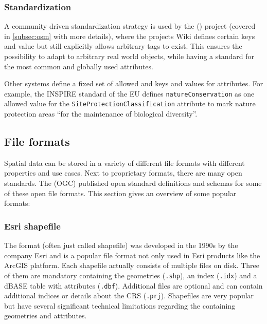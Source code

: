 		\subsubsection{Standardization}
		
			A community driven standardization strategy is used by the  () project (covered in \cref{subsec:osm} with more details), where the projects Wiki defines certain keys and value but still explicitly allows arbitrary tags to exist\cite{osm-wiki-proposal-process}.
			This ensures the possibility to adapt to arbitrary real world objects, while having a standard for the most common and globally used attributes.
			
			Other systems define a fixed set of allowed and keys and values for attributes.
			For example, the INSPIRE standard of the EU defines \texttt{natureConservation} as one allowed value for the \texttt{SiteProtectionClassification} attribute to mark nature protection areas \enquote{for the maintenance of biological diversity}\cite[31]{inspire-protected-sites}.
			
	\subsection{File formats}
	\label{subsec:file-formats}
	
		Spatial data can be stored in a variety of different file formats with different properties and use cases.
		Next to proprietary formats, there are many open standards.
		The  (OGC) published open standard definitions and schemas for some of these open file formats.		
		This section gives an overview of some popular formats:
		
		\subsubsection{Esri shapefile}
		\label{subsubsec:shapefile}
		
			The  format (often just called shapefile) was developed in the 1990s by the company Esri and is a popular file format not only used in Esri products like the ArcGIS platform.
			Each shapefile actually consists of multiple files on disk\cite{esri-shapefile-file-ext-spec}.
			Three of them are mandatory containing the geometries (\texttt{.shp}), an index (\texttt{.idx}) and a dBASE table with attributes (\texttt{.dbf}).
			Additional files are optional and can contain additional indices or details about the CRS (\texttt{.prj}).
			Shapefiles are very popular\cite[356]{spatial-file-formats-trends} but have several significant technical limitations regarding the containing geometries and attributes.
			
